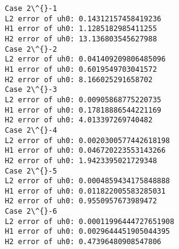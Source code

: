 \documentclass[11pt]{article}
\begin{document}
    \begin{Verbatim}[commandchars=\\\{\}]
Case 2\^{}-1
L2 error of uh0: 0.14312157458419236
H1 error of uh0: 1.1285182985411255
H2 error of uh0: 13.136803545627988
Case 2\^{}-2
L2 error of uh0: 0.041409209806485096
H1 error of uh0: 0.6019549703041572
H2 error of uh0: 8.166025291658702
Case 2\^{}-3
L2 error of uh0: 0.00905868775220735
H1 error of uh0: 0.17818886544221169
H2 error of uh0: 4.013397269740482
Case 2\^{}-4
L2 error of uh0: 0.0020300577442618198
H1 error of uh0: 0.046720223553143266
H2 error of uh0: 1.9423395021729348
Case 2\^{}-5
L2 error of uh0: 0.0004859434175848888
H1 error of uh0: 0.011822005583285031
H2 error of uh0: 0.9550957673989472
Case 2\^{}-6
L2 error of uh0: 0.00011996444727651908
H1 error of uh0: 0.0029644451905044395
H2 error of uh0: 0.47396480908547806
    \end{Verbatim}
\end{document}
